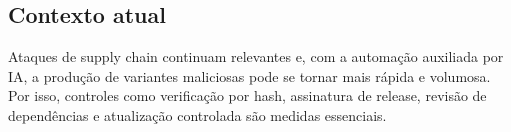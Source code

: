 \documentclass[12pt,a4paper]{article}
\begin{document}
\subsection{Contexto atual}
Ataques de supply chain continuam relevantes e, com a automação auxiliada por IA, a produção de variantes maliciosas pode se tornar mais rápida e volumosa. Por isso, controles como verificação por hash, assinatura de release, revisão de dependências e atualização controlada são medidas essenciais.
\end{document}
